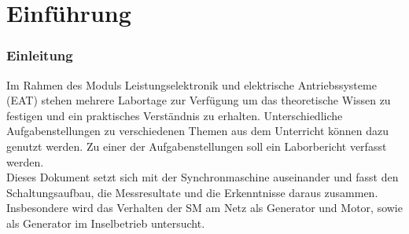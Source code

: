 


\tableofcontents

\newpage
\part{Einführung}

\section{Einleitung}
Im Rahmen des Moduls Leistungselektronik und elektrische Antriebssysteme (EAT) stehen mehrere Labortage zur Verfügung um das theoretische Wissen zu festigen und ein praktisches Verständnis zu erhalten. 
Unterschiedliche Aufgabenstellungen zu verschiedenen Themen aus dem Unterricht können dazu genutzt werden.
Zu einer der Aufgabenstellungen soll ein Laborbericht verfasst werden.\\

Dieses Dokument setzt sich mit der Synchronmaschine auseinander und fasst den Schaltungsaufbau, die Messresultate und die Erkenntnisse daraus zusammen.\\
Insbesondere wird das Verhalten der SM am Netz als Generator und Motor, sowie als Generator im Inselbetrieb untersucht.




